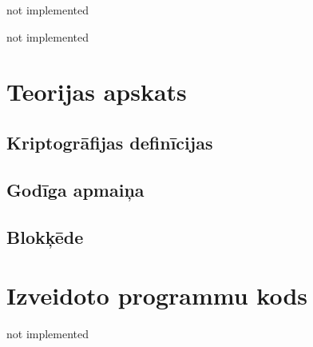 \documentclass[singlespacing, latexmargins]{ludis}
\begin{document}
\maketitle

\begin{abstract-lv}
    not implemented

\end{abstract-lv}

\begin{abstract-en}
    not implemented

\end{abstract-en}

\tableofcontents





\chapter{Teorijas apskats}


\section{Kriptogrāfijas definīcijas}


\section{Godīga apmaiņa}



\section{Blokķēde}









\appendix
\chapter{Izveidoto programmu kods}
not implemented
\end{document}

